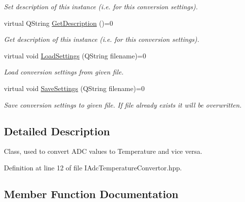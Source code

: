 \begin{DoxyCompactItemize}
\begin{DoxyCompactList}\small\item\em Set description of this instance (i.\+e. for this conversion settings). \end{DoxyCompactList}\item 
virtual Q\+String \hyperlink{class_interfaces_1_1_i_adc_temperature_convertor_a2f3b59be793c3ed43e880ef12e9749bc}{Get\+Description} ()=0
\begin{DoxyCompactList}\small\item\em Get description of this instance (i.\+e. for this conversion settings). \end{DoxyCompactList}\item 
virtual void \hyperlink{class_interfaces_1_1_i_adc_temperature_convertor_a9697a0319f82ebd1fc20f5e24d3b191c}{Load\+Settings} (Q\+String filename)=0
\begin{DoxyCompactList}\small\item\em Load conversion settings from given file. \end{DoxyCompactList}\item 
virtual void \hyperlink{class_interfaces_1_1_i_adc_temperature_convertor_a6631e979e067ab78d3e5c337449876ac}{Save\+Settings} (Q\+String filename)=0
\begin{DoxyCompactList}\small\item\em Save conversion settings to given file. If file already exists it will be overwritten. \end{DoxyCompactList}\end{DoxyCompactItemize}


\subsection{Detailed Description}
Class, used to convert A\+DC values to Temperature and vice versa. 

Definition at line 12 of file I\+Adc\+Temperature\+Convertor.\+hpp.



\subsection{Member Function Documentation}
\mbox{\label{class_interfaces_1_1_i_adc_temperature_convertor_aa6283c62cbbb012954b5e51d7a969385}} 
